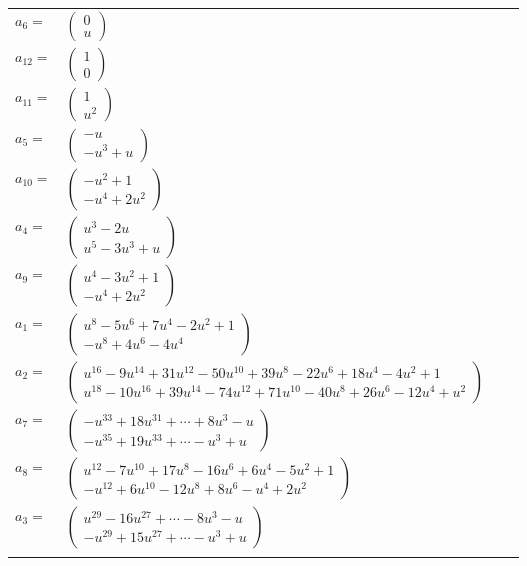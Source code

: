\documentclass[1p]{elsarticle_modified}
\theoremstyle{definition}
\begin{document}
\begin{tabular}{m{7pt} m{180pt} m{7pt} m{180pt} }
\flushright $a_{6}=$&$\begin{pmatrix}0\\u\end{pmatrix}$ \\
\flushright $a_{12}=$&$\begin{pmatrix}1\\0\end{pmatrix}$ \\
\flushright $a_{11}=$&$\begin{pmatrix}1\\u^2\end{pmatrix}$ \\
\flushright $a_{5}=$&$\begin{pmatrix}- u\\- u^3+u\end{pmatrix}$ \\
\flushright $a_{10}=$&$\begin{pmatrix}- u^2+1\\- u^4+2 u^2\end{pmatrix}$ \\
\flushright $a_{4}=$&$\begin{pmatrix}u^3-2 u\\u^5-3 u^3+u\end{pmatrix}$ \\
\flushright $a_{9}=$&$\begin{pmatrix}u^4-3 u^2+1\\- u^4+2 u^2\end{pmatrix}$ \\
\flushright $a_{1}=$&$\begin{pmatrix}u^8-5 u^6+7 u^4-2 u^2+1\\- u^8+4 u^6-4 u^4\end{pmatrix}$ \\
\flushright $a_{2}=$&$\begin{pmatrix}u^{16}-9 u^{14}+31 u^{12}-50 u^{10}+39 u^8-22 u^6+18 u^4-4 u^2+1\\u^{18}-10 u^{16}+39 u^{14}-74 u^{12}+71 u^{10}-40 u^8+26 u^6-12 u^4+u^2\end{pmatrix}$ \\
\flushright $a_{7}=$&$\begin{pmatrix}- u^{33}+18 u^{31}+\cdots+8 u^3- u\\- u^{35}+19 u^{33}+\cdots- u^3+u\end{pmatrix}$ \\
\flushright $a_{8}=$&$\begin{pmatrix}u^{12}-7 u^{10}+17 u^8-16 u^6+6 u^4-5 u^2+1\\- u^{12}+6 u^{10}-12 u^8+8 u^6- u^4+2 u^2\end{pmatrix}$ \\
\flushright $a_{3}=$&$\begin{pmatrix}u^{29}-16 u^{27}+\cdots-8 u^3- u\\- u^{29}+15 u^{27}+\cdots- u^3+u\end{pmatrix}$\\&\end{tabular}
\end{document}
